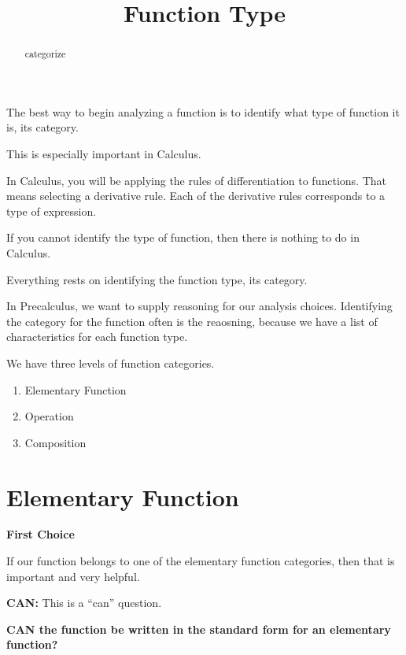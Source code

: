 \documentclass{ximera}
\title{Function Type}
\begin{document}
\begin{abstract}
categorize
\end{abstract}
\maketitle








The best way to begin analyzing a function is to identify what type of function it is, its category.

This is especially important in Calculus.   


In Calculus, you will be applying the rules of differentiation to functions. That means selecting a derivative rule.  Each of the derivative rules corresponds to a type of expression. 

If you cannot identify the type of function, then there is nothing to do in Calculus. 

Everything rests on identifying the function type, its category. 



In Precalculus, we want to supply reasoning for our analysis choices.  Identifying the category for the function often is the reaosning, because we have a list of characteristics for each function type. 



We have three levels of function categories.

\begin{enumerate}
    \item Elementary Function
    \item Operation
    \item Composition
\end{enumerate} 



\section*{Elementary Function}

\textbf{\textcolor{purple!85!blue}{First Choice}} 


If our function belongs to one of the elementary function categories, then that is important and very helpful. 


\textbf{\textcolor{purple!85!blue}{CAN:}}   This is a ``can'' question. 

\begin{center}
\textbf{\textcolor{red!70!black}{CAN the function be written in the standard form for an elementary function?}}

\end{center}
\end{document}
